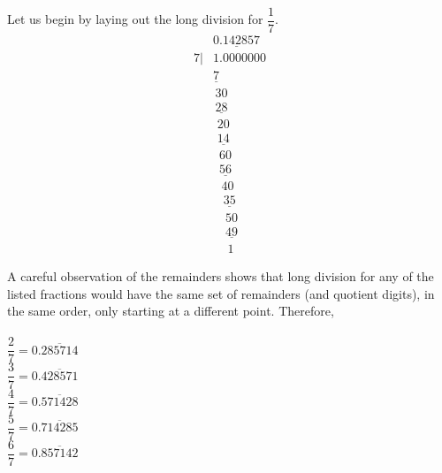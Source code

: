 \ifprintanswers
\fi 
\begin{solution}[\fullpage]
	Let us begin by laying out the long division for $\dfrac{1}{7}$.
	\begin{align}
		  & \underline{0.142857}  		\nonumber \\
		7|& 1.0000000 					\nonumber \\
		  & \underline{7}		 		\nonumber \\
		  & \,30	  					\nonumber \\	
		  & \,\underline{28}	 		\nonumber \\
		  & \,\,20						\nonumber \\
		  & \,\,\underline{14} 			\nonumber \\
		  & \,\,\,60					\nonumber \\
		  & \,\,\,\underline{56}		\nonumber \\
		  & \,\,\,\,40					\nonumber \\
		  & \,\,\,\,\,\underline{35}	\nonumber \\
		  & \,\,\,\,\,\,50				\nonumber \\
		  & \,\,\,\,\,\,\underline{49}	\nonumber \\
		  & \,\,\,\,\,\,\,1				\nonumber
	\end{align}
	
	A careful observation of the remainders shows that long division for any of the listed fractions would have the same set of remainders (and quotient digits), in the same order, only starting at a different point. Therefore,\\
	\\
	$\dfrac{2}{7} = 0.\overline{285714}$ \\
	$\dfrac{3}{7} = 0.\overline{428571}$ \\
	$\dfrac{4}{7} = 0.\overline{571428}$ \\
	$\dfrac{5}{7} = 0.\overline{714285}$ \\
	$\dfrac{6}{7} = 0.\overline{857142}$ 

\end{solution}
